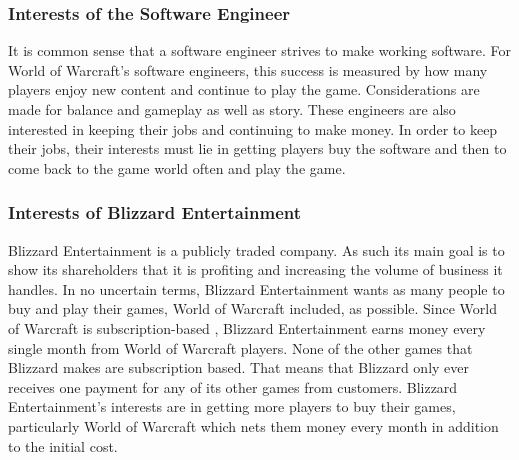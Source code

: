 \documentclass[11pt]{article}
\begin{document}
\begin{multicols}{2}
\subsubsection{Interests of the Software Engineer}
It is common sense that a software engineer strives to make working software. For World of Warcraft's software engineers, this success is measured by how many players enjoy new content and continue to play the game. Considerations are made for balance and gameplay as well as story. \cite{DevWatercooler} These engineers are also interested in keeping their jobs and continuing to make money. In order to keep their jobs, their interests must lie in getting players buy the software and then to come back to the game world often and play the game.
\subsubsection{Interests of Blizzard Entertainment}
Blizzard Entertainment is a publicly traded company. \cite{BlizzStock} As such its main goal is to show its shareholders that it is profiting and increasing the volume of business it handles. In no uncertain terms, Blizzard Entertainment wants as many people to buy and play their games, World of Warcraft included, as possible. Since World of Warcraft is subscription-based \cite{WoWSubscription}, Blizzard Entertainment earns money every single month from World of Warcraft players. None of the other games that Blizzard makes are subscription based. \cite{BlizzGameList} That means that Blizzard only ever receives one payment for any of its other games from customers. Blizzard Entertainment's interests are in getting more players to buy their games, particularly World of Warcraft which nets them money every month in addition to the initial cost.

\end{multicols}
\end{document}
